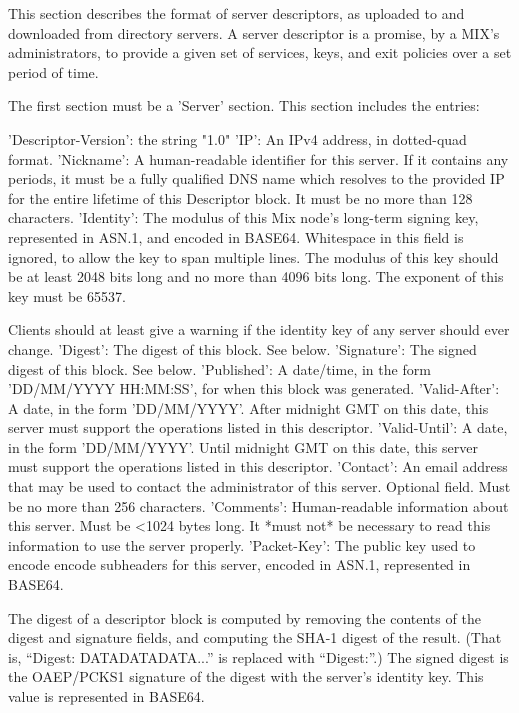 This section describes the format of server descriptors, as uploaded
to and downloaded from directory servers.  A server descriptor is a
promise, by a MIX's administrators, to provide a given set of
services, keys, and exit policies over a set period of time.

The first section must be a 'Server' section.  This section includes
the entries:

     'Descriptor-Version':  the string "1.0"
     'IP': An IPv4 address, in dotted-quad format.
     'Nickname': A human-readable identifier for this server.  If it
         contains any periods, it must be a fully qualified DNS name
         which resolves to the provided IP for the entire lifetime of
         this Descriptor block.  It must be no more than 128 characters.
     'Identity': The modulus of this Mix node's long-term signing key,
         represented in ASN.1, and encoded in BASE64.  Whitespace in
         this field is ignored, to allow the key to span multiple
         lines.  The modulus of this key should be at least 2048 bits
         long and no more than 4096 bits long.  The exponent of this 
         key must be 65537.

	 Clients should at least give a warning if the identity key of
         any server should ever change.
     'Digest': The digest of this block. See below.
     'Signature': The signed digest of this block.  See below.
     'Published': A date/time, in the form 'DD/MM/YYYY HH:MM:SS',
         for when this block was generated.
     'Valid-After': A date, in the form 'DD/MM/YYYY'.  After midnight GMT
         on this date, this server must support the operations listed
         in this descriptor.
     'Valid-Until': A date, in the form 'DD/MM/YYYY'.  Until midnight
         GMT on this date, this server must support the operations listed
         in this descriptor.
     'Contact': An email address that may be used to contact the
         administrator of this server. Optional field.  Must be no
         more than 256 characters.
     'Comments': Human-readable information about this server.  Must
         be <1024 bytes long.  It *must not* be necessary to read this
         information to use the server properly.
     'Packet-Key': The public key used to encode encode subheaders for
         this server, encoded in ASN.1, represented in BASE64. 

The digest of a descriptor block is computed by removing the contents
of the digest and signature fields, and computing the SHA-1 digest of
the result.  (That is, ``Digest: DATADATADATA...'' is replaced with
``Digest:''.)  The signed digest is the OAEP/PCKS1 signature of the
digest with the server's identity key.  This value is represented in
BASE64.

